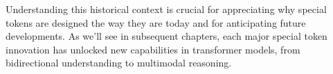 


Understanding this historical context is crucial for appreciating why special tokens are designed the way they are today and for anticipating future developments. As we'll see in subsequent chapters, each major special token innovation has unlocked new capabilities in transformer models, from bidirectional understanding to multimodal reasoning.